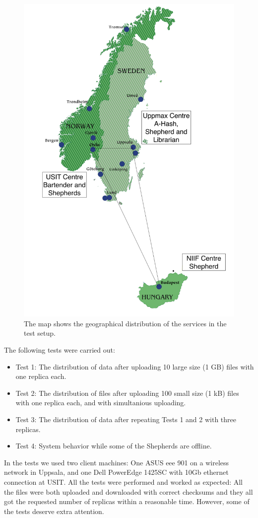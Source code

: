 \documentclass[final]{ieee}
\begin{document}
\begin{figure}
\centering
\includegraphics[width=0.7\columnwidth]{map}
\caption{The map shows the geographical distribution of the services in the test setup.}
\label{fig:map}
\end{figure}  

The following tests were carried out:

\begin{itemize}
\item Test 1: The distribution of data after uploading 10 large size (1 GB)
  files with one replica each.  
\item Test 2: The distribution of files after uploading 100 small size (1 kB)
  files with one replica each, and with simultanious uploading.
\item Test 3: The distribution of data after repeating Tests 1 and 2 with three replicas.  
\item Test 4: System behavior while some of the Shepherds are offline.   
\end{itemize}

In the tests we used two client machines: One ASUS eee 901 on a wireless network in Uppsala, 
and one Dell PowerEdge 1425SC with 10Gb ethernet connection at USIT. All the tests were performed and worked as expected: All the files were both 
uploaded and downloaded with correct checksums and they all got the requested 
number of replicas within a reasonable time. However, some of
the tests deserve extra attention.
\end{document}
